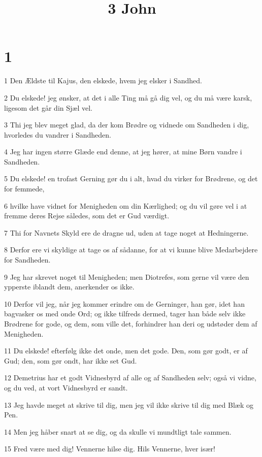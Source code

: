 

\title{3 John}


\chapter{1}

\par 1 Den Ældste til Kajus, den elskede, hvem jeg elsker i Sandhed.
\par 2 Du elskede! jeg ønsker, at det i alle Ting må gå dig vel, og du må være karsk, ligesom det går din Sjæl vel.
\par 3 Thi jeg blev meget glad, da der kom Brødre og vidnede om Sandheden i dig, hvorledes du vandrer i Sandheden.
\par 4 Jeg har ingen større Glæde end denne, at jeg hører, at mine Børn vandre i Sandheden.
\par 5 Du elskede! en trofast Gerning gør du i alt, hvad du virker for Brødrene, og det for femmede,
\par 6 hvilke have vidnet for Menigheden om din Kærlighed; og du vil gøre vel i at fremme deres Rejse således, som det er Gud værdigt.
\par 7 Thi for Navnets Skyld ere de dragne ud, uden at tage noget at Hedningerne.
\par 8 Derfor ere vi skyldige at tage os af sådanne, for at vi kunne blive Medarbejdere for Sandheden.
\par 9 Jeg har skrevet noget til Menigheden; men Diotrefes, som gerne vil være den ypperste iblandt dem, anerkender os ikke.
\par 10 Derfor vil jeg, når jeg kommer erindre om de Gerninger, han gør, idet han bagvasker os med onde Ord; og ikke tilfreds dermed, tager han både selv ikke Brødrene for gode, og dem, som ville det, forhindrer han deri og udstøder dem af Menigheden.
\par 11 Du elskede! efterfølg ikke det onde, men det gode. Den, som gør godt, er af Gud; den, som gør ondt, har ikke set Gud.
\par 12 Demetrius har et godt Vidnesbyrd af alle og af Sandheden selv; også vi vidne, og du ved, at vort Vidnesbyrd er sandt.
\par 13 Jeg havde meget at skrive til dig, men jeg vil ikke skrive til dig med Blæk og Pen.
\par 14 Men jeg håber snart at se dig, og da skulle vi mundtligt tale sammen.
\par 15 Fred være med dig! Vennerne hilse dig. Hils Vennerne, hver især!


